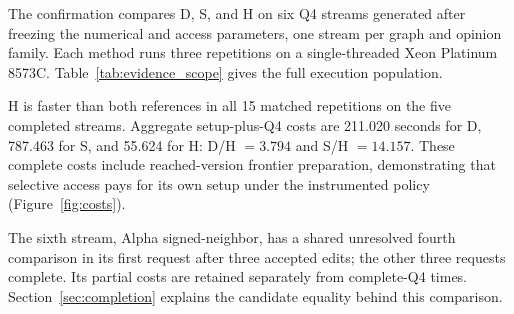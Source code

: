 The confirmation compares D, S, and H on six Q4 streams generated after freezing the numerical and access parameters, one stream per graph and opinion family. Each method runs three repetitions on a single-threaded Xeon Platinum 8573C. Table~\ref{tab:evidence_scope} gives the full execution population.

H is faster than both references in all 15 matched repetitions on the five completed streams. Aggregate setup-plus-Q4 costs are 211.020 seconds for D, 787.463 for S, and 55.624 for H: D/H $=3.794$ and S/H $=14.157$. These complete costs include reached-version frontier preparation, demonstrating that selective access pays for its own setup under the instrumented policy (Figure~\ref{fig:costs}).

The sixth stream, Alpha signed-neighbor, has a shared unresolved fourth comparison in its first request after three accepted edits; the other three requests complete. Its partial costs are retained separately from complete-Q4 times. Section~\ref{sec:completion} explains the candidate equality behind this comparison.
